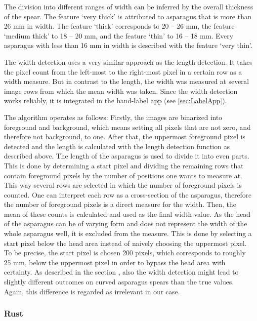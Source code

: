 \bigskip
The division into different ranges of width can be inferred by the overall thickness of the spear. The feature ‘very thick’ is attributed to asparagus that is more than 26 mm in width. The feature ‘thick’ corresponds to 20 -- 26 mm, the feature ‘medium thick’ to 18 -- 20 mm, and the feature ‘thin’ to 16 -- 18 mm. Every asparagus with less than 16 mm in width is described with the feature ‘very thin’.

\bigskip
The width detection uses a very similar approach as the length detection. It takes the pixel count from the left-most to the right-most pixel in a certain row as a width measure. But in contrast to the length, the width was measured at several image rows from which the mean width was taken. Since the width detection works reliably, it is integrated in the hand-label app (see \autoref{sec:LabelApp}).

The algorithm operates as follows: Firstly, the images are binarized into foreground and background, which means setting all pixels that are not zero, and therefore not background, to one. After that, the uppermost foreground pixel is detected and the length is calculated with the length detection function as described above. The length of the asparagus is used to divide it into even parts. This is done by determining a start pixel and dividing the remaining rows that contain foreground pixels by the number of positions one wants to measure at. This way several rows are selected in which the number of foreground pixels is counted. One can interpret each row as a cross-section of the asparagus, therefore the number of foreground pixels is a direct measure for the width. Then, the mean of these counts is calculated and used as the final width value. As the head of the asparagus can be of varying form and does not represent the width of the whole asparagus well, it is excluded from the measure. This is done by selecting a start pixel below the head area instead of naively choosing the uppermost pixel. To be precise, the start pixel is chosen 200 pixels, which corresponds to roughly 25 mm, below the uppermost pixel in order to bypass the head area with certainty. As described in the section , also the width detection might lead to slightly different outcomes on curved asparagus spears than the true values. Again, this difference is regarded as irrelevant in our case.


\subsubsection{Rust}
\label{subsec:Rust}


